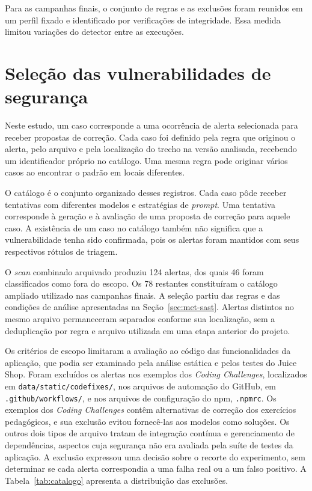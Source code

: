 Para as campanhas finais, o conjunto de regras e as exclusões foram reunidos em um perfil fixado e identificado por verificações de integridade. Essa medida limitou variações do detector entre as execuções.

\section{Seleção das vulnerabilidades de segurança}
\label{sec:met-selecao}

Neste estudo, um caso corresponde a uma ocorrência de alerta selecionada para receber propostas de correção. Cada caso foi definido pela regra que originou o alerta, pelo arquivo e pela localização do trecho na versão analisada, recebendo um identificador próprio no catálogo. Uma mesma regra pode originar vários casos ao encontrar o padrão em locais diferentes.

O catálogo é o conjunto organizado desses registros. Cada caso pôde receber tentativas com diferentes modelos e estratégias de \textit{prompt}. Uma tentativa corresponde à geração e à avaliação de uma proposta de correção para aquele caso. A existência de um caso no catálogo também não significa que a vulnerabilidade tenha sido confirmada, pois os alertas foram mantidos com seus respectivos rótulos de triagem.

O \textit{scan} combinado arquivado produziu 124 alertas, dos quais 46 foram classificados como fora do escopo. Os 78 restantes constituíram o catálogo ampliado utilizado nas campanhas finais. A seleção partiu das regras e das condições de análise apresentadas na Seção~\ref{sec:met-sast}. Alertas distintos no mesmo arquivo permaneceram separados conforme sua localização, sem a deduplicação por regra e arquivo utilizada em uma etapa anterior do projeto.

Os critérios de escopo limitaram a avaliação ao código das funcionalidades da aplicação, que podia ser examinado pela análise estática e pelos testes do Juice Shop. Foram excluídos os alertas nos exemplos dos \textit{Coding Challenges}, localizados em \texttt{data/static/codefixes/}, nos arquivos de automação do GitHub, em \texttt{.github/workflows/}, e nos arquivos de configuração do npm, \texttt{.npmrc}. Os exemplos dos \textit{Coding Challenges} contêm alternativas de correção dos exercícios pedagógicos, e sua exclusão evitou fornecê-las aos modelos como soluções. Os outros dois tipos de arquivo tratam de integração contínua e gerenciamento de dependências, aspectos cuja segurança não era avaliada pela suíte de testes da aplicação. A exclusão expressou uma decisão sobre o recorte do experimento, sem determinar se cada alerta correspondia a uma falha real ou a um falso positivo. A Tabela~\ref{tab:catalogo} apresenta a distribuição das exclusões.

